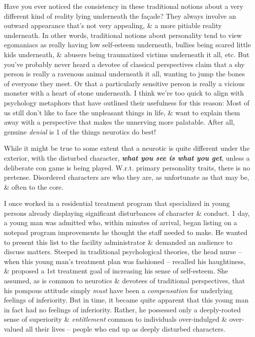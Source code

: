 \documentclass{article}
\numberwithin{equation}{section}
\begin{document}
Have you ever noticed the consistency in these traditional notions about a very different kind of reality lying underneath the fa\c{c}ade? They always involve an outward appearance that's not very appealing, \& a more pitiable reality underneath. In other words, traditional notions about personality tend to view egomaniacs as really having low self-esteem underneath, bullies being scared little kids underneath, \& abusers being traumatized victims underneath it all, etc. But you've probably never heard a devotee of classical perspectives claim that a shy person is really a ravenous animal underneath it all, wanting to jump the bones of everyone they meet. Or that a particularly sensitive person is really a vicious monster with a heart of stone underneath. I think we're too quick to align with psychology metaphors that have outlined their usefulness for this reason: Most of us still don't like to face the unpleasant things in life, \& want to explain them away with a perspective that makes the unnerving more palatable. After all, genuine \textit{denial} is 1 of the things neurotics do best!

While it might be true to some extent that a neurotic is quite different under the exterior, with the disturbed character, \textbf{\textit{what you see is what you get}}, unless a deliberate con game is being played. W.r.t. primary personality traits, there is no pretense. Disordered characters are who they are, as unfortunate as that may be, \& often to the core.

I once worked in a residential treatment program that specialized in young persons already displaying significant disturbances of character \& conduct. 1 day, a young man was admitted who, within minutes of arrival, began listing on a notepad program improvements he thought the staff needed to make. He wanted to present this list to the facility administrator \& demanded an audience to discuss matters. Steeped in traditional psychological theories, the head nurse -- when this young man's treatment plan was fashioned -- recalled his haughtiness, \& proposed a 1st treatment goal of increasing his sense of self-esteem. She assumed, as is common to neurotics \& devotees of traditional perspectives, that his pompous attitude simply \textit{must} have been a \textit{compensation} for underlying feelings of inferiority. But in time, it became quite apparent that this young man in fact had no feelings of inferiority. Rather, he possessed only a deeply-rooted sense of superiority \& \textit{entitlement} common to individuals over-indulged \& over-valued all their lives -- people who end up as deeply disturbed characters.
\end{document}
